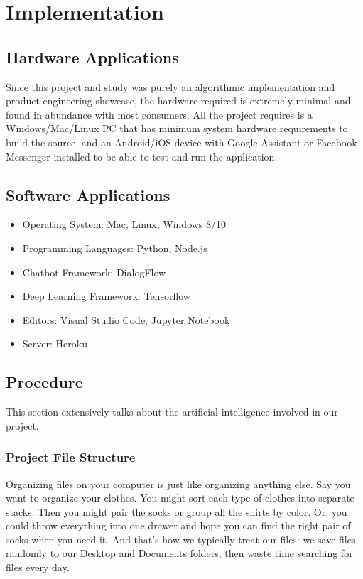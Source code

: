 \chapter{Implementation}

\pagebreak

\section{Hardware Applications}

Since this project and study was purely an algorithmic implementation and product engineering showcase, the hardware required is extremely minimal and found in abundance with most consumers. All the project requires is a Windows/Mac/Linux PC that has minimum system hardware requirements to build the source, and an Android/iOS device with Google Assistant or Facebook Messenger installed to be able to test and run the application.

\section{Software Applications}

\begin{itemize}
    \item Operating System: Mac, Linux, Windows 8/10
    \item Programming Languages: Python, Node.js
    \item Chatbot Framework: DialogFlow
    \item Deep Learning Framework: Tensorflow
    \item Editors: Visual Studio Code, Jupyter Notebook
    \item Server: Heroku
\end{itemize}

\pagebreak

\section{Procedure}

This section extensively talks about the artificial intelligence involved in our project.

\subsection{Project File Structure}

Organizing files on your computer is just like organizing anything else. Say you want to organize your clothes. You might sort each type of clothes into separate stacks. Then you might pair the socks or group all the shirts by color. Or, you could throw everything into one drawer and hope you can find the right pair of socks when you need it. And that's how we typically treat our files: we save files randomly to our Desktop and Documents folders, then waste time searching for files every day.

